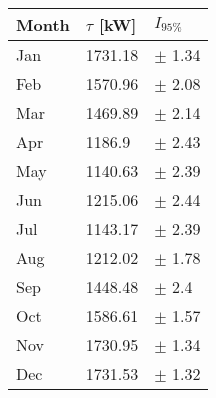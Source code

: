 \begin{tabular}{lll}
\toprule
Month & $\tau$ [kW] &   $I_{95\%}$ \\
\midrule
  Jan &     1731.18 &   $\pm$ 1.34 \\
  Feb &     1570.96 &   $\pm$ 2.08 \\
  Mar &     1469.89 &   $\pm$ 2.14 \\
  Apr &      1186.9 &   $\pm$ 2.43 \\
  May &     1140.63 &   $\pm$ 2.39 \\
  Jun &     1215.06 &   $\pm$ 2.44 \\
  Jul &     1143.17 &   $\pm$ 2.39 \\
  Aug &     1212.02 &   $\pm$ 1.78 \\
  Sep &     1448.48 &    $\pm$ 2.4 \\
  Oct &     1586.61 &   $\pm$ 1.57 \\
  Nov &     1730.95 &   $\pm$ 1.34 \\
  Dec &     1731.53 &   $\pm$ 1.32 \\
\bottomrule
\end{tabular}

